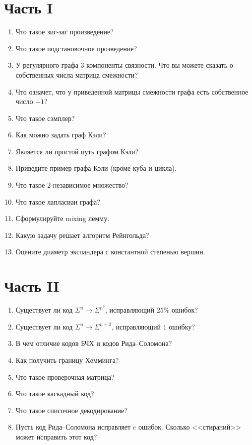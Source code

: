 

\newcommand{\norm}[1]{\left\lVert#1\right\rVert}




\section*{Часть I}
\begin{enumerate}
    \item Что такое зиг-заг произведение?
    \item Что такое подстановочное прозведение?
    \item У регулярного графа $3$ компоненты связности. Что вы можете сказать о собственных числа матрица
        смежности?
    \item Что означет, что у приведенной матрицы смежности графа есть собственное число $-1$?
    \item Что такое сэмплер?
    \item Как можно задать граф Кэли?
    \item Является ли простой путь графом Кэли?
    \item Приведите пример графа Кэли (кроме куба и цикла).
    \item Что такое $2$-независимое множество?
    \item Что такое лапласиан графа?
    \item Сформулируйте mixing лемму.
    \item Какую задачу решает алгоритм Рейнгольда?
    \item Оцените диаметр экспандера с константной степенью вершин.
\end{enumerate}

\section*{Часть II}
\begin{enumerate}
    \item Существует ли код $\Sigma^{n} \to \Sigma^{n^3}$, исправляющий $25\%$ ошибок?
    \item Существует ли код $\Sigma^{n} \to \Sigma^{n + 2}$, исправляющий $1$ ошибку?
    \item В чем отличие кодов БЧХ и кодов Рида--Соломона?
    \item Как получить границу Хемминга?
    \item Что такое проверочная матрица?
    \item Что такое каскадный код?
    \item Что такое списочное декодирование?
    \item Пусть код Рида--Соломона исправляет $e$ ошибок. Сколько <<стираний>> может исправить этот код?
\end{enumerate}




